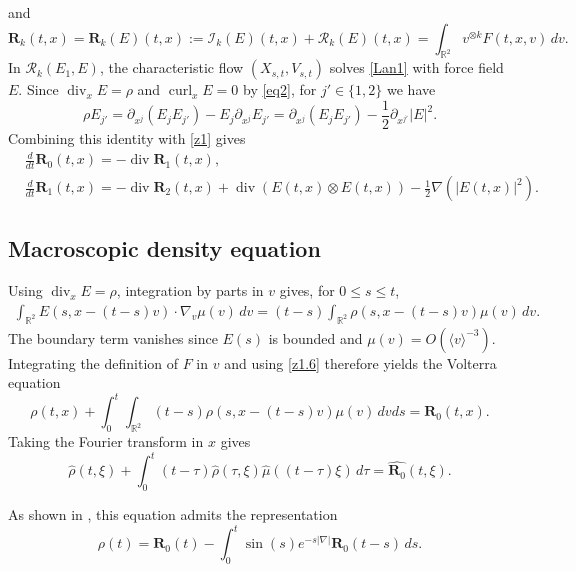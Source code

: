 \documentclass[reqno,11pt]{amsart}
\numberwithin{equation}{section}
\def\R{{\mathbb R}}
\def\R{{\bf R}}
\def\R{\mathbb{R}}
\begin{document}
	and
	\begin{equation}\label{z1.6}
		\mathbf{R}_k(t,x)=	\mathbf{R}_k(E)(t,x):=\mathcal{I}_k(E)(t,x)+\mathcal{R}_k(E)(t,x)=\int_{\R^2} v^{\otimes k}F(t,x,v)\,dv.
	\end{equation}
	In $\mathcal R_k(E_1,E)$, the characteristic flow
	$(X_{s,t},V_{s,t})$ solves \eqref{Lan1} with force field $E$.
	Since $\operatorname{div}_xE=\rho$ and $\operatorname{curl}_xE=0$
	by \eqref{eq2}, for $j'\in\{1,2\}$ we have
	\[
	\rho E_{j'}
	=\partial_{x^j}(E_jE_{j'})-E_j\partial_{x^j}E_{j'}
	=\partial_{x^j}(E_jE_{j'})-\frac12\partial_{x^{j'}}|E|^2.
	\]
	Combining this identity with \eqref{z1} gives
	\begin{align}\label{z5}
		&	\frac{d}{dt}	\mathbf{R}_0(t,x)=-\operatorname{div}	\mathbf{R}_1(t,x),\\&
		\frac{d}{dt}	\mathbf{R}_1(t,x)=-\operatorname{div}	\mathbf{R}_2(t,x)+\operatorname{div}(E(t,x)\otimes E(t,x))-\frac{1}{2}\nabla(| E(t,x)|^2)\label{z5'}.
	\end{align}
	
	\subsection{Macroscopic density equation}
	
	Using $\operatorname{div}_xE=\rho$, integration by parts in $v$
	gives, for $0\leq s\leq t$,
	\begin{align*}
	\int_{\mathbb R^2}E(s,x-(t-s)v)\cdot\nabla_v\mu(v)\,dv=(t-s)\int_{\mathbb R^2}\rho(s,x-(t-s)v)\mu(v)\,dv.
	\end{align*}
	The boundary term vanishes since $E(s)$ is bounded and
	$\mu(v)=O(\langle v\rangle^{-3})$.
	Integrating the definition of $F$ in $v$ and using \eqref{z1.6}
	therefore yields the Volterra equation
	\begin{equation}\label{rhoEq}
		\rho(t,x)
		+ \int_0^t\!\!\int_{\R^2} (t-s)\rho(s,x-(t-s)v)\mu(v)\,dvds
		= \mathbf{R}_0(t,x).
	\end{equation}
	Taking the Fourier transform in $x$ gives
	\begin{equation}\label{Volterra}
		\widehat{\rho}(t,\xi)
		+ \int_0^t (t-\tau)\widehat{\rho}(\tau,\xi)\widehat{\mu}((t-\tau)\xi)\,d\tau
		= \widehat{\mathbf{R}_0}(t,\xi).
	\end{equation}
	
	As shown in \cite{AIonescu2022}, this equation admits the representation
	\begin{equation}\label{z40}
		\rho(t)
		= \mathbf{R}_0(t)
		- \int_0^t \sin(s)e^{-s|\nabla|}\mathbf{R}_0(t-s)\,ds .
	\end{equation}
	
\end{document}

